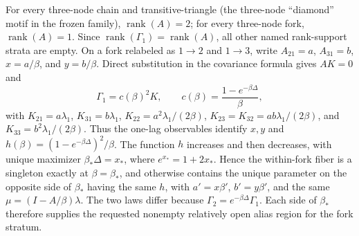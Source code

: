 For every three-node chain and transitive-triangle (the three-node ``diamond'' motif in the frozen family), \(\operatorname{rank}(A)=2\); for every three-node fork, \(\operatorname{rank}(A)=1\).  Since \(\operatorname{rank}(\Gamma_1)=\operatorname{rank}(A)\), all other named rank-support strata are empty.  On a fork relabeled as \(1\to2\) and \(1\to3\), write \(A_{21}=a\), \(A_{31}=b\), \(x=a/\beta\), and \(y=b/\beta\).  Direct substitution in the covariance formula gives \(AK=0\) and
\[
 \Gamma_1=c(\beta)^2K,\qquad c(\beta)=\frac{1-e^{-\beta\Delta}}{\beta},
\]
with \(K_{21}=a\lambda_1\), \(K_{31}=b\lambda_1\), \(K_{22}=a^2\lambda_1/(2\beta)\), \(K_{23}=K_{32}=ab\lambda_1/(2\beta)\), and \(K_{33}=b^2\lambda_1/(2\beta)\).  Thus the one-lag observables identify \(x,y\) and \(h(\beta)=(1-e^{-\beta\Delta})^2/\beta\).  The function \(h\) increases and then decreases, with unique maximizer \(\beta_*\Delta=x_*\), where \(e^{x_*}=1+2x_*\).  Hence the within-fork fiber is a singleton exactly at \(\beta=\beta_*\), and otherwise contains the unique parameter on the opposite side of \(\beta_*\) having the same \(h\), with \(a'=x\beta'\), \(b'=y\beta'\), and the same \(\mu=(I-A/\beta)\lambda\).  The two laws differ because \(\Gamma_2=e^{-\beta\Delta}\Gamma_1\).  Each side of \(\beta_*\) therefore supplies the requested nonempty relatively open alias region for the fork stratum.